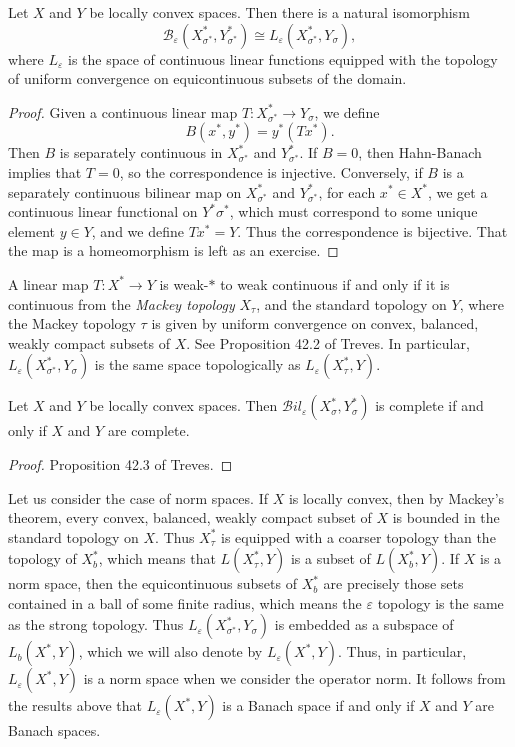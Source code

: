 \begin{lemma}
    Let $X$ and $Y$ be locally convex spaces. Then there is a natural isomorphism
    \[ \mathcal{B}_\varepsilon(X^*_{\sigma^*}, Y^*_{\sigma^*}) \cong L_\varepsilon(X^*_{\sigma^*}, Y_\sigma), \]
    where $L_\varepsilon$ is the space of continuous linear functions equipped with the topology of uniform convergence on equicontinuous subsets of the domain.
\end{lemma}
\begin{proof}
    Given a continuous linear map $T: X^*_{\sigma^*} \to Y_\sigma$, we define
    \[ B(x^*,y^*) = y^*(Tx^*). \]
    Then $B$ is separately continuous in $X^*_{\sigma^*}$ and $Y^*_{\sigma^*}$. If $B = 0$, then Hahn-Banach implies that $T = 0$, so the correspondence is injective. Conversely, if $B$ is a separately continuous bilinear map on $X^*_{\sigma^*}$ and $Y^*_{\sigma^*}$, for each $x^* \in X^*$, we get a continuous linear functional on $Y^*{\sigma^*}$, which must correspond to some unique element $y \in Y$, and we define $Tx^* = Y$. Thus the correspondence is bijective. That the map is a homeomorphism is left as an exercise.
\end{proof}

\begin{remark}
    A linear map $T: X^* \to Y$ is weak-$*$ to weak continuous if and only if it is continuous from the \emph{Mackey topology} $X_\tau$, and the standard topology on $Y$, where the Mackey topology $\tau$ is given by uniform convergence on convex, balanced, weakly compact subsets of $X$. See Proposition 42.2 of Treves. In particular, $L_\varepsilon(X^*_{\sigma^*}, Y_\sigma)$ is the same space topologically as $L_\varepsilon(X^*_\tau, Y)$.
\end{remark}

\begin{theorem}
    Let $X$ and $Y$ be locally convex spaces. Then $\mathcal{B}il_\varepsilon(X^*_\sigma, Y^*_\sigma)$ is complete if and only if $X$ and $Y$ are complete.
\end{theorem}
\begin{proof}
    Proposition 42.3 of Treves.
\end{proof}

Let us consider the case of norm spaces. If $X$ is locally convex, then by Mackey's theorem, every convex, balanced, weakly compact subset of $X$ is bounded in the standard topology on $X$. Thus $X^*_\tau$ is equipped with a coarser topology than the topology of $X^*_b$, which means that $L(X^*_\tau, Y)$ is a subset of $L(X^*_b,Y)$. If $X$ is a norm space, then the equicontinuous subsets of $X^*_b$ are precisely those sets contained in a ball of some finite radius, which means the $\varepsilon$ topology is the same as the strong topology. Thus $L_\varepsilon(X^*_{\sigma^*}, Y_\sigma)$ is embedded as a subspace of $L_b(X^*, Y)$, which we will also denote by $L_\varepsilon(X^*,Y)$. Thus, in particular, $L_\varepsilon(X^*,Y)$ is a norm space when we consider the operator norm. It follows from the results above that $L_\varepsilon(X^*,Y)$ is a Banach space if and only if $X$ and $Y$ are Banach spaces.

